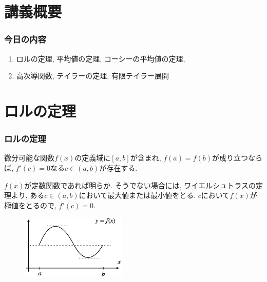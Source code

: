 \section{講義概要}


\begin{frame}
\frametitle{今日の内容}



\begin{enumerate}
\item ロルの定理, 平均値の定理, コーシーの平均値の定理, 
\item 高次導関数, テイラーの定理, 有限テイラー展開
\end{enumerate} 



\end{frame}









\section{ロルの定理}


\begin{frame}
\frametitle{ロルの定理}


\begin{Thm}[ロルの定理]
微分可能な関数$f(x)$の定義域に$[a,b]$が含まれ, $f(a)=f(b)$が成り立つならば, 
$f'(c)=0$なる$c \in (a,b)$が存在する. 
\end{Thm}

$f(x)$が定数関数であれば明らか. 
そうでない場合には, ワイエルシュトラスの定理より, ある$c \in (a,b)$において最大値または最小値をとる. 
$c$において$f(x)$が極値をとるので, $f'(c)=0$. 

 \begin{figure}[htbp]
 \begin{center} 
  \includegraphics[width=50mm]{calculus8/Roll.png}
 \end{center}
\end{figure}

\end{frame}



